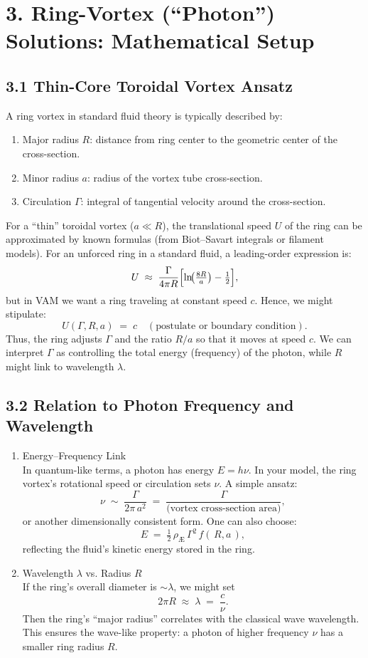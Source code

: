 \section*{3. Ring-Vortex (“Photon”) Solutions: Mathematical Setup}
\subsection*{3.1 Thin-Core Toroidal Vortex Ansatz}
A ring vortex in standard fluid theory is typically described by:
\begin{enumerate}
 \item Major radius \(R\): distance from ring center to the geometric center of the cross-section.
 \item Minor radius \(a\): radius of the vortex tube cross-section.
 \item Circulation \(\Gamma\): integral of tangential velocity around the cross-section.
\end{enumerate}
For a “thin” toroidal vortex (\(a \ll R\)), the translational speed \(U\) of the ring can be approximated by known formulas (from Biot–Savart integrals or filament models). For an unforced ring in a standard fluid, a leading-order expression is:
\[
 U \;\approx\; \frac{\Gamma}{4\pi R} \Bigl[\ln\!\bigl(\tfrac{8R}{a}\bigr) - \tfrac12\Bigr],
\]
but in VAM we want a ring traveling at constant speed \(c\). Hence, we might stipulate:
\[
 U(\Gamma, R, a) \;=\; c \quad (\text{postulate or boundary condition}).
\]
Thus, the ring adjusts \(\Gamma\) and the ratio \(R/a\) so that it moves at speed \(c\). We can interpret \(\Gamma\) as controlling the total energy (frequency) of the photon, while \(R\) might link to wavelength \(\lambda\).

\subsection*{3.2 Relation to Photon Frequency and Wavelength}
\begin{enumerate}
 \item Energy–Frequency Link\\
 In quantum-like terms, a photon has energy \(E = h\nu\). In your model, the ring vortex’s rotational speed or circulation sets \(\nu\). A simple ansatz:
 \[
  \nu \;\sim\; \frac{\Gamma}{2\pi\,a^2} \;=\; \frac{\Gamma}{\text{(vortex cross-section area)}},
 \]
 or another dimensionally consistent form. One can also choose:
 \[
  E \;=\; \tfrac12\,\rho_{\scriptscriptstyle \mathrm{Æ}} \,\Gamma^2\,f(\,R,a\,),
 \]
 reflecting the fluid’s kinetic energy stored in the ring.

 \item Wavelength \(\lambda\) vs. Radius \(R\)\\
 If the ring’s overall diameter is \(\sim \lambda\), we might set
 \[
  2\pi R \;\approx\; \lambda \;=\; \frac{c}{\nu}.
 \]
 Then the ring’s “major radius” correlates with the classical wave wavelength. This ensures the wave-like property: a photon of higher frequency \(\nu\) has a smaller ring radius \(R\).
\end{enumerate}

